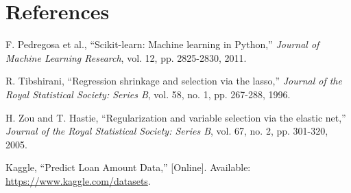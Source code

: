 \documentclass[12pt,a4paper]{article}
\begin{document}
\section{References}
\begin{enumerate}[label={[\arabic*]}]
\item F. Pedregosa et al., ``Scikit-learn: Machine learning in Python,'' \textit{Journal of Machine Learning Research}, vol. 12, pp. 2825-2830, 2011.
\item R. Tibshirani, ``Regression shrinkage and selection via the lasso,'' \textit{Journal of the Royal Statistical Society: Series B}, vol. 58, no. 1, pp. 267-288, 1996.
\item H. Zou and T. Hastie, ``Regularization and variable selection via the elastic net,'' \textit{Journal of the Royal Statistical Society: Series B}, vol. 67, no. 2, pp. 301-320, 2005.
\item Kaggle, ``Predict Loan Amount Data,'' [Online]. Available: \url{https://www.kaggle.com/datasets}.
\end{enumerate}
\end{document}
